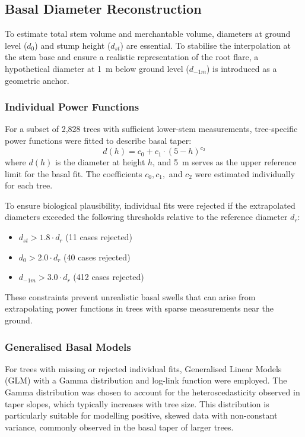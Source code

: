 \documentclass[twocolumn, bibliography=totoc]{scrartcl}
\begin{document}
\subsection{Basal Diameter Reconstruction}

To estimate total stem volume and merchantable volume, diameters at ground level ($d_0$) and stump height ($d_{st}$) are essential. To stabilise the interpolation at the stem base and ensure a realistic representation of the root flare, a hypothetical diameter at \qty{1}{m} below ground level ($d_{-1m}$) is introduced as a geometric anchor.

\subsubsection{Individual Power Functions}

For a subset of 2,828 trees with sufficient lower-stem measurements, tree-specific power functions were fitted to describe basal taper:
\begin{equation}
d(h) = c_0 + c_1 \cdot (5 - h)^{c_2}
\end{equation}
where $d(h)$ is the diameter at height $h$, and \qty{5}{m} serves as the upper reference limit for the basal fit. The coefficients $c_0, c_1,$ and $c_2$ were estimated individually for each tree.

To ensure biological plausibility, individual fits were rejected if the extrapolated diameters exceeded the following thresholds relative to the reference diameter $d_r$:
\begin{itemize}
\item $d_{st} > 1.8 \cdot d_r$ (11 cases rejected)
\item $d_0 > 2.0 \cdot d_r$ (40 cases rejected)
\item $d_{-1m} > 3.0 \cdot d_r$ (412 cases rejected)
\end{itemize}
These constraints prevent unrealistic basal swells that can arise from extrapolating power functions in trees with sparse measurements near the ground.


\subsubsection{Generalised Basal Models}

For trees with missing or rejected individual fits, Generalised Linear Models (GLM) with a Gamma distribution and log-link function were employed. The Gamma distribution was chosen to account for the heteroscedasticity observed in taper slopes, which typically increases with tree size. This distribution is particularly suitable for modelling positive, skewed data with non-constant variance, commonly observed in the basal taper of larger trees.
\end{document}
